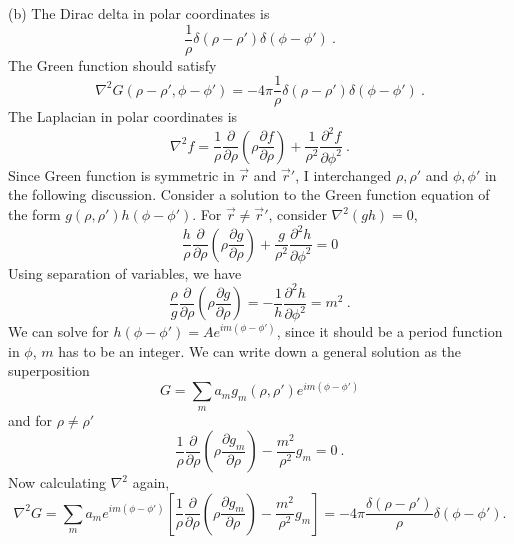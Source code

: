 \documentclass[12pt]{article}
\begin{document}
\newpage
{} (b) The Dirac delta in polar coordinates is
\begin{equation}
    \frac{1}{\rho} \delta(\rho - \rho') \delta(\phi - \phi')~.
\end{equation}
The Green function should satisfy
\begin{equation}
    \nabla^2 G(\rho-\rho', \phi-\phi') = - 4\pi \frac{1}{\rho}\delta(\rho - \rho') \delta(\phi - \phi')~.
\end{equation}
The Laplacian in polar coordinates is
\begin{equation}
    \nabla^2 f = \frac{1}{\rho} \frac{\partial}{\partial \rho} \left(\rho \frac{\partial f}{\partial \rho}\right) + \frac{1}{\rho^2} \frac{\partial^2 f}{\partial \phi^2}~.
\end{equation}
Since Green function is symmetric in $\vec r$ and $\vec r'$, I interchanged $\rho, \rho'$ and $\phi, \phi'$ in the following discussion.
Consider a solution to the Green function equation of the form
$g(\rho, \rho') h(\phi - \phi')$.
For $\vec r \neq \vec r'$, consider $\nabla^2 (gh) = 0$,
\begin{equation}
    \frac{h}{\rho} \frac{\partial}{\partial \rho} \left(\rho \frac{\partial g}{\partial \rho}\right) + \frac{g}{\rho^2} \frac{\partial^2 h}{\partial \phi^2} = 0
\end{equation}
Using separation of variables, we have
\begin{equation}
    \frac{\rho}{g} \frac{\partial}{\partial \rho} \left(\rho \frac{\partial g}{\partial \rho}\right) = - \frac{1}{h}\frac{\partial ^2 h}{\partial \phi^2} = m^2~.
\end{equation}
We can solve for $h(\phi - \phi') = A e^{im(\phi - \phi')}$, since it should be a period function in $\phi$, $m$ has to be an integer. We can write down a general solution as the superposition
$$G = \sum_{m} a_m g_m(\rho, \rho')e^{im(\phi - \phi')}$$
and for $\rho \neq \rho'$
\begin{equation}
    \frac{1}{\rho} \frac{\partial}{\partial \rho} \left(\rho \frac{\partial g_m}{\partial \rho}\right)-\frac{m^2}{\rho^2}g_m = 0~.
\end{equation}
Now calculating $\nabla^2$ again,
\begin{equation}
    \nabla^2 G =  \sum_m a_m e^{im (\phi - \phi')} \left[\frac{1}{\rho} \frac{\partial}{\partial \rho} \left(\rho \frac{\partial g_m}{\partial \rho}\right)-\frac{m^2}{\rho^2}g_m\right] = -4\pi\frac{\delta(\rho - \rho')}{\rho} \delta(\phi - \phi') .\nonumber
\end{equation}
\end{document}
